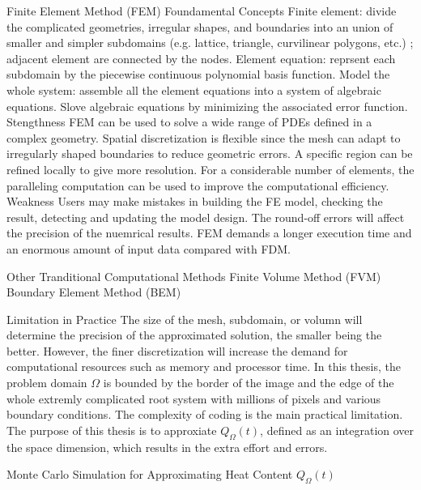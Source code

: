\documentclass{article}
\begin{document}
\begin{outline}[enumerate]
    \2 Finite Element Method (FEM) \cite{zlamal1968finite}
      \3 Foundamental Concepts 
         \4 Finite element: divide the complicated geometries, irregular shapes, and boundaries into an union of smaller and simpler subdomains (e.g. lattice, triangle, curvilinear polygons, etc.) \cite{logan2011first}; adjacent element are connected by the nodes.
         \4 Element equation: reprsent each subdomain by the piecewise continuous polynomial basis function.
         \4 Model the whole system: assemble all the element equations into a system of algebraic equations.
         \4 Slove algebraic equations by minimizing the associated error function.
      \3 Stengthness
         \4 FEM can be used to solve a wide range of PDEs defined in a complex geometry.
         \4 Spatial discretization is flexible since the mesh can adapt to irregularly shaped boundaries to reduce geometric errors.
         \4 A specific region can be refined locally to give more resolution.
         \4 For a considerable number of elements, the paralleling computation can be used to improve the computational efficiency.
      \3 Weakness
         \4 Users may make mistakes in building the FE model, checking the result, detecting and updating the model design.
         \4 The round-off errors will affect the precision of the nuemrical results.
         \4 FEM demands a longer execution time and an enormous amount of input data compared with FDM.
      
    \2 Other Tranditional Computational Methods
      \3 Finite Volume Method (FVM) \cite{eymard2000finite}
      \3 Boundary Element Method (BEM) \cite{attaway1991boundary}
      
    \2 Limitation in Practice  
      \3 The size of the mesh, subdomain, or volumn will determine the precision of the approximated solution, the smaller being the better. However, the finer discretization will increase the demand for computational resources such as memory and processor time.
      \3 In this thesis, the problem domain $\Omega$ is bounded by the border of the image and the edge of the whole extremly complicated root system with millions of pixels and various boundary conditions. The complexity of coding is the main practical limitation.
      \3 The purpose of this thesis is to approxiate $Q_{\Omega}(t)$, defined as an integration over the space dimension, which results in the extra effort and errors.
        

   \newpage

   \1 Monte Carlo Simulation for Approximating Heat Content $Q_{\Omega}(t)$


\end{outline}
\end{document}

